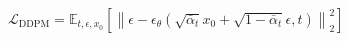 $\mathcal{L}_{\mathrm{DDPM}}=\mathbb{E}_{t,\epsilon,x_0}\left[\left\lVert\epsilon-\epsilon_\theta\left(\sqrt{\bar{\alpha}_t}x_0+\sqrt{1-\bar{\alpha}_t}\epsilon,t\right)\right\rVert_2^2\right]$
